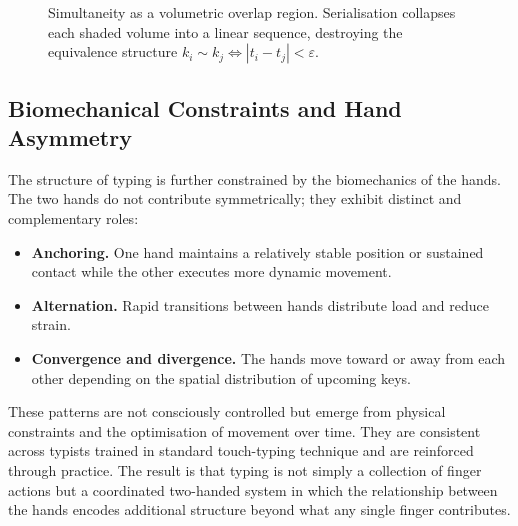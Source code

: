 \documentclass[11pt, a4paper]{article}
\begin{document}
\begin{figure}[h]
\centering
{}
\caption{Simultaneity as a volumetric overlap region. Serialisation collapses
each shaded volume into a linear sequence, destroying the equivalence
structure $k_i \sim k_j \iff |t_i - t_j| < \varepsilon$.}
\label{fig:overlap}
\end{figure}

\subsection{Biomechanical Constraints and Hand Asymmetry}

The structure of typing is further constrained by the biomechanics of
the hands. The two hands do not contribute symmetrically; they exhibit
distinct and complementary roles:

\begin{itemize}[leftmargin=2em]
  \item \textbf{Anchoring.} One hand maintains a relatively stable
    position or sustained contact while the other executes more dynamic
    movement.
  \item \textbf{Alternation.} Rapid transitions between hands distribute
    load and reduce strain.
  \item \textbf{Convergence and divergence.} The hands move toward or
    away from each other depending on the spatial distribution of
    upcoming keys.
\end{itemize}

These patterns are not consciously controlled but emerge from physical
constraints and the optimisation of movement over time. They are
consistent across typists trained in standard touch-typing technique and
are reinforced through practice. The result is that typing is not simply
a collection of finger actions but a coordinated two-handed system in
which the relationship between the hands encodes additional structure
beyond what any single finger contributes.
\end{document}

